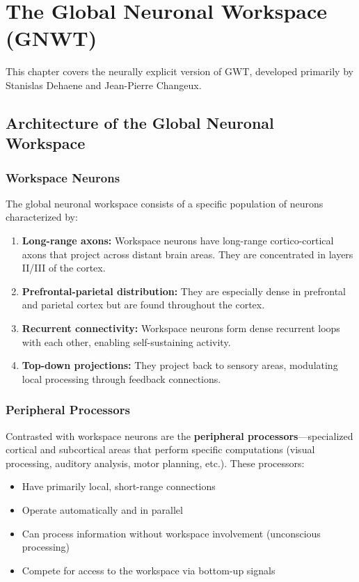 \documentclass[11pt,a4paper]{report}
\begin{document}
\chapter{The Global Neuronal Workspace (GNWT)}

This chapter covers the neurally explicit version of GWT, developed primarily by Stanislas Dehaene and Jean-Pierre Changeux.

\section{Architecture of the Global Neuronal Workspace}

\subsection{Workspace Neurons}

The global neuronal workspace consists of a specific population of neurons characterized by:

\begin{mechbox}
\begin{enumerate}[leftmargin=1.5em]
  \item \textbf{Long-range axons:} Workspace neurons have long-range cortico-cortical axons that project across distant brain areas. They are concentrated in layers II/III of the cortex.
  \item \textbf{Prefrontal-parietal distribution:} They are especially dense in prefrontal and parietal cortex but are found throughout the cortex.
  \item \textbf{Recurrent connectivity:} Workspace neurons form dense recurrent loops with each other, enabling self-sustaining activity.
  \item \textbf{Top-down projections:} They project back to sensory areas, modulating local processing through feedback connections.
\end{enumerate}
\end{mechbox}

\subsection{Peripheral Processors}

Contrasted with workspace neurons are the \textbf{peripheral processors}---specialized cortical and subcortical areas that perform specific computations (visual processing, auditory analysis, motor planning, etc.). These processors:
\begin{itemize}[leftmargin=1.5em]
  \item Have primarily local, short-range connections
  \item Operate automatically and in parallel
  \item Can process information without workspace involvement (unconscious processing)
  \item Compete for access to the workspace via bottom-up signals
\end{itemize}
\end{document}
